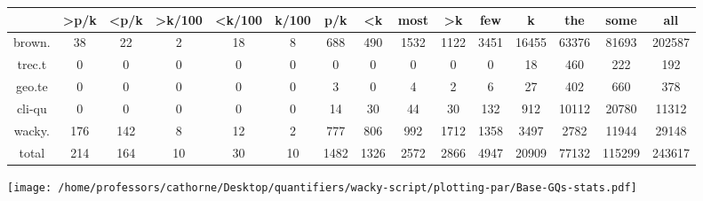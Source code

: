 \documentclass[a4,10pt]{article}
\begin{document}
\begin{sidewaystable}[p]
\tiny{\begin{tabular}{|c|c|c|c|c|c|c|c|c|c|c|c|c|c|c|}
 & >p/k & <p/k & >k/100 & <k/100 & k/100 & p/k & <k & most & >k & few & k & the & some & all\\
\hline
brown. & 38 & 22 & 2 & 18 & 8 & 688 & 490 & 1532 & 1122 & 3451 & 16455 & 63376 & 81693 & 202587\\
trec.t & 0 & 0 & 0 & 0 & 0 & 0 & 0 & 0 & 0 & 0 & 18 & 460 & 222 & 192\\
geo.te & 0 & 0 & 0 & 0 & 0 & 3 & 0 & 4 & 2 & 6 & 27 & 402 & 660 & 378\\
cli-qu & 0 & 0 & 0 & 0 & 0 & 14 & 30 & 44 & 30 & 132 & 912 & 10112 & 20780 & 11312\\
wacky. & 176 & 142 & 8 & 12 & 2 & 777 & 806 & 992 & 1712 & 1358 & 3497 & 2782 & 11944 & 29148\\
\hline
total & 214 & 164 & 10 & 30 & 10 & 1482 & 1326 & 2572 & 2866 & 4947 & 20909 & 77132 & 115299 & 243617
\end{tabular}}
\end{sidewaystable}



\vspace{0.2cm}

\begin{center}
\texttt{[image: /home/professors/cathorne/Desktop/quantifiers/wacky-script/plotting-par/Base-GQs-stats.pdf]}
\end{center}
\end{document}
